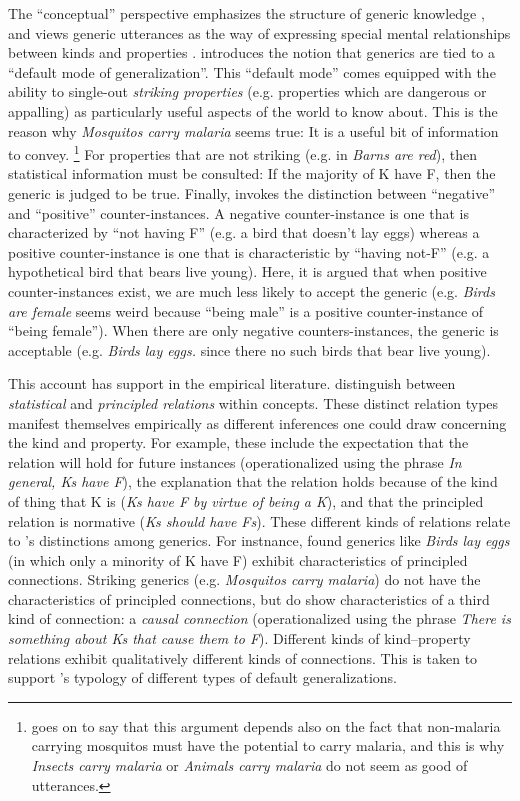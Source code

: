 \documentclass[12pt,letterpaper]{article}
\begin{document}
The ``conceptual'' perspective emphasizes the structure of generic knowledge \cite{Prasada2000}, and views generic utterances as the way of expressing special mental relationships between kinds and properties \cite{Leslie2008, Prasada2012}. 
 introduces the notion that generics are tied to a ``default mode of generalization''. 
This ``default mode'' comes equipped with the ability to single-out \emph{striking properties} (e.g. properties which are dangerous or appalling) as particularly useful aspects of the world to know about. 
This is the reason why \emph{Mosquitos carry malaria} seems true: It is a useful bit of information to convey.
\footnote{\citeauthor{Leslie2007} goes on to say that this argument depends also on the fact that non-malaria carrying mosquitos must have the potential to carry malaria, and this is why \emph{Insects carry malaria} or \emph{Animals carry malaria} do not seem as good of utterances.}
For properties that are not striking (e.g. in \emph{Barns are red}), then statistical information must be consulted: If the majority of K have F, then the generic is judged to be true. Finally, \citeauthor{Leslie2007} invokes the distinction between ``negative'' and ``positive'' counter-instances. A negative counter-instance is one that is characterized by ``not having F'' (e.g. a bird that doesn't lay eggs) whereas a positive counter-instance is one that is characteristic by ``having not-F'' (e.g. a hypothetical bird that bears live young). Here, it is argued that when positive counter-instances exist, we are much less likely to accept the generic (e.g. \emph{Birds are female} seems weird because ``being male'' is a positive counter-instance of ``being female''). 
When there are only negative counters-instances, the generic is acceptable (e.g. \emph{Birds lay eggs.} since there no such birds that bear live young).

This account has support in the empirical literature.
 distinguish between \emph{statistical} and \emph{principled relations} within concepts. 
These distinct relation types manifest themselves empirically as different inferences one could draw concerning the kind and property. 
For example, these include the expectation that the relation will hold for future instances (operationalized using the phrase \emph{In general, Ks have F}), the explanation that the relation holds because of the kind of thing that K is (\emph{Ks have F by virtue of being a K}), and that the principled relation is normative (\emph{Ks should have Fs}).
These different kinds of relations relate to 's distinctions among generics.
For instnance,  found generics like \emph{Birds lay eggs} (in which only a minority of K have F) exhibit characteristics of principled connections. 
Striking generics (e.g. \emph{Mosquitos carry malaria}) do not have the characteristics of principled connections, but do show characteristics of a third kind of connection: a \emph{causal connection} (operationalized using the phrase \emph{There is something about Ks that cause them to F}). 
Different kinds of kind--property relations exhibit qualitatively different kinds of connections. 
This is taken to support 's typology of different types of default generalizations.
\end{document}
